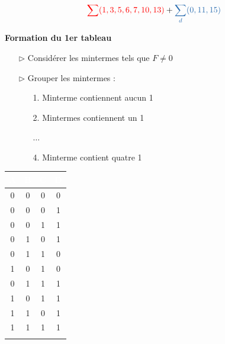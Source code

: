 \documentclass{report}
\begin{document}
\begin{multicols*}{3}
  \begin{align*}
    \textcolor{red}{\sum (1, 3, 5, 6, 7, 10, 13)} + \textcolor{myb}{\sum_{d} (0, 11, 15)}  
  \end{align*}

  \textbf{Formation du 1er tableau}
  \begin{itemize}
    \item [$\rhd$ ] Considérer les mintermes tels que $F \neq 0$ 
    \item [$\rhd$ ] Grouper les mintermes : 
      \begin{itemize}
        \item [1.] Minterme contiennent aucun 1 
        \item [2.] Mintermes contiennent un 1 
        \item [ ] $\dots$ 
        \item [4.] Minterme contient quatre 1 


      \end{itemize}
  \end{itemize}


      \begin{center}
          \begin{tabular}{c c c c}
          \rowcolor{myg}
          \textcolor{white}{A} & \textcolor{white}{B} & \textcolor{white}{C} & \textcolor{white}{D} \\
          \hline
          0 & 0 & 0 & 0 \\
          \arrayrulecolor{red}
          \hline
          \rowcolor{myg!40}
          0 & 0 & 0 & 1 \\
          \hline
          0 & 0 & 1 & 1 \\
          \arrayrulecolor{myg}
          0 & 1 & 0 & 1 \\
          0 & 1 & 1 & 0 \\
          1 & 0 & 1 & 0 \\
          \arrayrulecolor{red}
          \hline
          \rowcolor{myg!40}
          0 & 1 & 1 & 1 \\
          \rowcolor{myg!40}
          1 & 0 & 1 & 1 \\
          \rowcolor{myg!40}
          1 & 1 & 0 & 1 \\
          \hline
          1 & 1 & 1 & 1 \\ 
          \arrayrulecolor{myg!40}
          \end{tabular}  
      \end{center} 



\end{multicols*}
\end{document}
